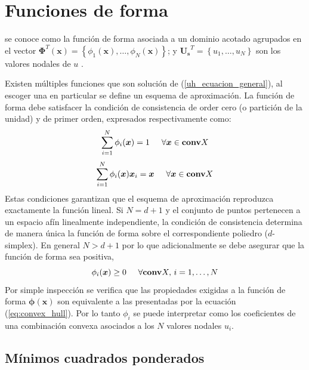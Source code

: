 
\section{Funciones de forma} \label{seccion:funciones_de_forma}

 se conoce como la función de forma asociada a un dominio acotado agrupados en el vector $\bm{\Phi}^T(\bm{x}) = \left\{ \phi_1(\bm{x}), \ldots , \phi_N(\bm{x}) \right\} $; y $ \bm{U_s}^T = \left\{ u_1, \ldots, u_N \right\} $ son los valores nodales de $u$ . 

Existen múltiples funciones que son solución de (\ref{uh_ecuacion_general}), al escoger una en particular se define un esquema de aproximación. La función de forma debe satisfacer la condición de consistencia de order cero (o partición de la unidad) y de primer orden, expresados respectivamente como:
\begin{equation} \label{0_orden_consistencia}
\sum_{i=1}^{N} \phi_i(\bm{x}) = 1 \hspace{0,5cm} \forall \bm{x} \in \bm{\mbox{conv}} X 
\end{equation}
\begin{equation} \label{1_orden_consistencia}
\sum_{i=1}^{N} \phi_{i}(\bm{x}) \bm{x}_i = \bm{x} \hspace{0,5cm} \forall \bm{x} \in \bm{\mbox{conv}} X 
\end{equation}
Estas condiciones garantizan que el esquema de aproximación reproduzca exactamente la función lineal. Si $N=d+1$ y el conjunto de puntos pertenecen a un espacio afín linealmente independiente, la condición de consistencia determina de manera única la función de forma sobre el correspondiente poliedro ($d$-simplex). En general $N > d+1$ por lo que adicionalmente se debe asegurar que la función de forma sea positiva,
\begin{equation}
\phi_i(\bm{x}) \geq 0 \hspace{0,5cm} \forall \bm{\mbox{conv}} X, \, i=1,\ldots,N
\end{equation} 
Por simple inspección se verifica que las propiedades exigidas a la función de forma $\bm{\phi}(\bm{x})$ son equivalente a las presentadas por la ecuación (\ref{eq:convex_hull}). Por lo tanto $\phi_i $ se puede interpretar como los coeficientes de una combinación convexa asociados a los $N$ valores nodales $u_i$.

\subsection{Mínimos cuadrados ponderados}

